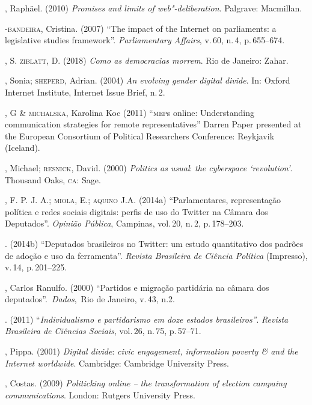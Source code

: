 \begin{bibliohedra}
, Raphäel. (2010) \textit{Promises and limits of web"-deliberation}.
Palgrave: Macmillan.

-\textsc{bandeira}, Cristina. (2007) ``The impact of the Internet on
parliaments: a legislative studies framework''. \textit{Parliamentary
Affairs}, v.\,60, n.\,4, p.\,655--674.

, S. \textsc{ziblatt}, D. (2018) \textit{Como as democracias morrem}. Rio
de Janeiro: Zahar.

, Sonia; \textsc{sheperd}, Adrian. (2004) \textit{An evolving gender digital
divide}. In: Oxford Internet Institute, Internet Issue Brief, n.\,2.

, G \& \textsc{michalska}, Karolina Koc (2011) ``\textsc{mep}s online:
Understanding communication strategies for remote representatives''
Darren Paper presented at the European Consortium of Political
Researchers Conference: Reykjavik (Iceland).

, Michael; \textsc{resnick}, David. (2000) \textit{Politics as usual}:
\textit{the cyberspace `revolution'}. Thousand Oaks, \textsc{ca}: Sage.

, F. P. J. A.; \textsc{miola}, E.; \textsc{aquino} J.A. (2014a) ``Parlamentares,
representação política e redes sociais digitais: perfis de uso do
Twitter na Câmara dos Deputados''. \textit{Opinião Pública}, Campinas,
vol.\,20, n.\,2, p.\,178--203.

\titidem. (2014b) ``Deputados
brasileiros no Twitter: um estudo quantitativo dos padrões de adoção e
uso da ferramenta''. \textit{Revista Brasileira de Ciência Política}
(Impresso), v.\,14, p.\,201--225.

, Carlos Ranulfo. (2000) ``Partidos e migração partidária na câmara
dos deputados''.~\textit{Dados},~Rio de Janeiro, v.\,43, n.2.

\titidem. (2011) ``\textit{Individualismo e partidarismo em
doze estados brasileiros''}. \textit{Revista Brasileira de Ciências
Sociais}, vol.\,26, n.\,75, p.\,57--71.

, Pippa. (2001) \textit{Digital divide}: \textit{civic engagement,
information poverty \& and the Internet worldwide}. Cambridge: Cambridge
University Press.

, Costas. (2009) \textit{Politicking online -- the
transformation of election campaing communications}. London: Rutgers
University Press.


\end{bibliohedra}
